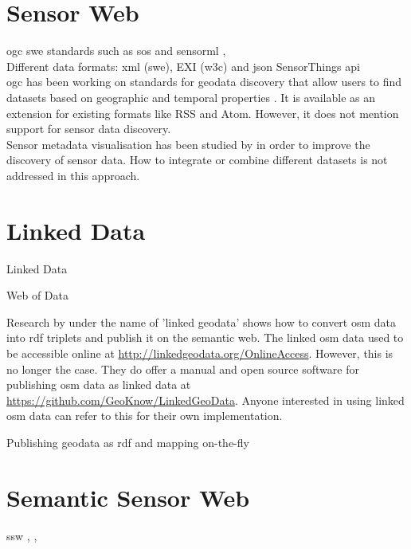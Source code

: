 \iffalse
\section{Sensor Web}

\ac{ogc} \ac{swe} standards such as \ac{sos} and \ac{sensorml} \citep{SW:OGC}, \citep{SW:Botts} \\

Different data formats: \ac{xml} (\ac{swe}), EXI (\ac{w3c}) and \ac{json} SensorThings \ac{api} \citep{IOT:Zanelli} \\

\ac{ogc} has been working on standards for geodata discovery that allow users to find datasets based on geographic and temporal properties \citep{SW:OGC2}. It is available as an extension for existing formats like RSS and Atom. However, it does not mention support for sensor data discovery. \\

Sensor metadata visualisation has been studied by \cite{SW:Yoo} in order to improve the discovery of sensor data. How to integrate or combine different datasets is not addressed in this approach. 


\section{Linked Data}

Linked Data \citep{LD:Berners-lee}

Web of Data \cite{LD:Bizer} 

Research by \cite{LD:Auer} under the name of 'linked geodata' shows how to convert \ac{osm} data into \ac{rdf} triplets and publish it on the semantic web. The linked \ac{osm} data used to be accessible online at \url{http://linkedgeodata.org/OnlineAccess}. However, this is no longer the case. They do offer a manual and open source software for publishing \ac{osm} data as linked data at \url{https://github.com/GeoKnow/LinkedGeoData}. Anyone interested in using linked \ac{osm} data can refer to this for their own implementation.     

Publishing geodata as \ac{rdf} and mapping on-the-fly \citep{LD:Missier}


\section{Semantic Sensor Web}

\ac{ssw} \citep{SSW:Sheth}, \citep{SSW:deMel}, \citep{SSW:Bakillah} \\ 

